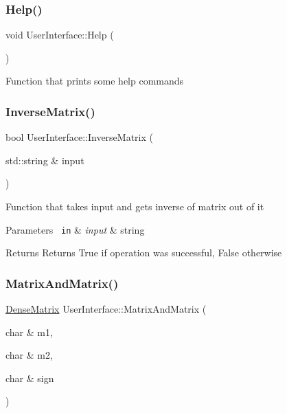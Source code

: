 \subsubsection{\texorpdfstring{Help()}{Help()}}
{\footnotesize\ttfamily void User\+Interface\+::\+Help (\begin{DoxyParamCaption}{ }\end{DoxyParamCaption})}

Function that prints some help commands \mbox{\label{class_user_interface_a4401c31d4d576435c580f9d92b5e2c85}} 
\subsubsection{\texorpdfstring{InverseMatrix()}{InverseMatrix()}}
{\footnotesize\ttfamily bool User\+Interface\+::\+Inverse\+Matrix (\begin{DoxyParamCaption}\item[{std\+::string \&}]{input }\end{DoxyParamCaption})}

Function that takes input and gets inverse of matrix out of it 
\begin{DoxyParams}[1]{Parameters}
\mbox{\texttt{ in}}  & {\em input} & string \\
\hline
\end{DoxyParams}
\begin{DoxyReturn}{Returns}
Returns True if operation was successful, False otherwise 
\end{DoxyReturn}
\mbox{\label{class_user_interface_a7b28a49562754ca62e4c06d4398e1c7a}} 
\subsubsection{\texorpdfstring{MatrixAndMatrix()}{MatrixAndMatrix()}}
{\footnotesize\ttfamily \mbox{\hyperlink{class_dense_matrix}{Dense\+Matrix}} User\+Interface\+::\+Matrix\+And\+Matrix (\begin{DoxyParamCaption}\item[{char \&}]{m1,  }\item[{char \&}]{m2,  }\item[{char \&}]{sign }\end{DoxyParamCaption})}

